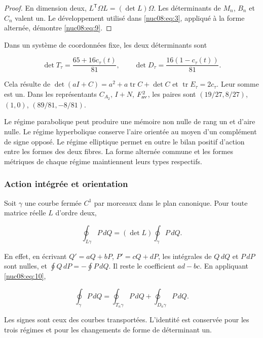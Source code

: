 \begin{proof}
En dimension deux, \(L^\mathsf T\Omega L=(\det L)\Omega\). Les déterminants de \(M_n\), \(B_n\) et \(C_n\) valent un. Le développement utilisé dans \eqref{nuc08:eq:3}, appliqué à la forme alternée, démontre \eqref{nuc08:eq:9}.

\end{proof}

Dans un système de coordonnées fixe, les deux déterminants sont

\begin{equation}
\det T_\tau=\frac{65+16c_\tau(t)}{81},\qquad
\det D_\tau=\frac{16(1-c_\tau(t))}{81}.
\label{nuc08:eq:10}
\end{equation}

Cela résulte de \(\det(aI+C)=a^2+a\operatorname{tr}C+\det C\) et \(\operatorname{tr}E_\tau=2c_\tau\). Leur somme est un. Dans les représentants \(C_{A_2}\), \(I+N\), \(F_{\rm av}^2\), les paires sont \((19/27,8/27)\), \((1,0)\), \((89/81,-8/81)\).

Le régime parabolique peut produire une mémoire non nulle de rang un et d’aire nulle. Le régime hyperbolique conserve l’aire orientée au moyen d’un complément de signe opposé. Le régime elliptique permet en outre le bilan positif d’action entre les formes des deux fibres. La forme alternée commune et les formes métriques de chaque régime maintiennent leurs types respectifs.

\subsubsection{Action intégrée et orientation
}

Soit \(\gamma\) une courbe fermée \(C^1\) par morceaux dans le plan canonique. Pour toute matrice réelle \(L\) d’ordre deux,


\[
\oint_{L\gamma}P\,dQ=(\det L)\oint_\gamma P\,dQ.
\]

En effet, en écrivant \(Q'=aQ+bP\), \(P'=cQ+dP\), les intégrales de \(Q\,dQ\) et \(P\,dP\) sont nulles, et \(\oint Q\,dP=-\oint P\,dQ\). Il reste le coefficient \(ad-bc\). En appliquant \eqref{nuc08:eq:10},

\begin{equation}
\boxed{\oint_\gamma P\,dQ
=\oint_{T_n\gamma}P\,dQ+\oint_{D_n\gamma}P\,dQ.}
\label{nuc08:eq:11}
\end{equation}

Les signes sont ceux des courbes transportées. L’identité est conservée pour les trois régimes et pour les changements de forme de déterminant un.


